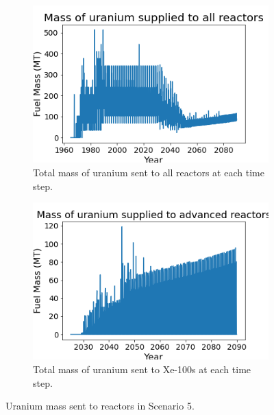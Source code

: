 \begin{figure}
    \centering
    \begin{subfigure}{0.4\textwidth}
        \centering
        \includegraphics[scale=0.3]{figures/fuelsupply_scenarios_5.png}
        \caption{Total mass of uranium sent to all reactors at each time step.}
        \label{fig:totalfuel_5}
    \end{subfigure}
    \begin{subfigure}{0.4\textwidth}
        \centering
        \includegraphics[scale=0.3]{figures/advancedRX_fuelsupply_scenarios_5.png}
        \caption{Total mass of uranium sent to Xe-100s at each time step.}
        \label{fig:haleu_5}
    \end{subfigure}
    \caption{Uranium mass sent to reactors in Scenario 5.}
    \label{fig:fuel_5}
\end{figure}


